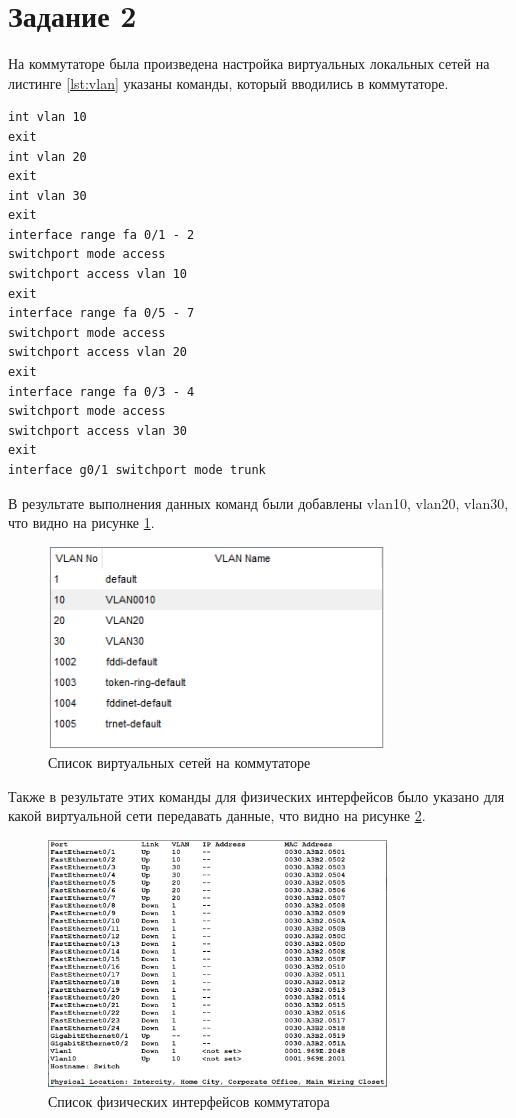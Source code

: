 \section{Задание 2}

На коммутаторе была произведена настройка виртуальных локальных сетей на листинге \ref{lst:vlan} указаны команды, который вводились в коммутаторе.

\begin{lstlisting}[frame=single,caption=Команды для настройки коммутатора,label=lst:vlan]
int vlan 10
exit
int vlan 20
exit
int vlan 30
exit
interface range fa 0/1 - 2
switchport mode access
switchport access vlan 10
exit
interface range fa 0/5 - 7
switchport mode access
switchport access vlan 20
exit
interface range fa 0/3 - 4
switchport mode access
switchport access vlan 30
exit
interface g0/1 switchport mode trunk
\end{lstlisting}

В результате выполнения данных команд были добавлены vlan10, vlan20, vlan30, что видно на рисунке \ref{fig:vlan_database}.

\begin{figure}[H]
    \centering
    \includegraphics[width=0.8\textwidth]{img/content/vlan_database.png}
    \caption{Список виртуальных сетей на коммутаторе}
    \label{fig:vlan_database}
\end{figure}

Также в результате этих команды для физических интерфейсов было указано для какой виртуальной сети передавать данные, что видно на рисунке \ref{fig:int_vlan}.

\begin{figure}[H]
    \centering
    \includegraphics[width=0.8\textwidth]{img/content/int_vlan.png}
    \caption{Список физических интерфейсов коммутатора}
    \label{fig:int_vlan}
\end{figure}

